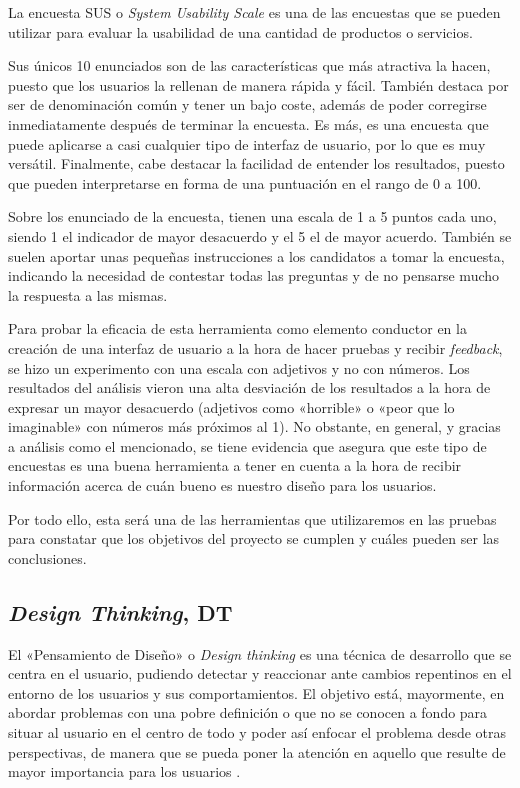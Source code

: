 La encuesta SUS o \textit{System Usability Scale} \cite{sus} es una de las encuestas que se pueden utilizar para evaluar la usabilidad de una cantidad de productos o servicios.

Sus únicos 10 enunciados son de las características que más atractiva la hacen, puesto que los usuarios la rellenan de manera rápida y fácil. También destaca por ser de denominación común y tener un bajo coste, además de poder corregirse inmediatamente después de terminar la encuesta. Es más, es una encuesta que puede aplicarse a casi cualquier tipo de interfaz de usuario, por lo que es muy versátil. Finalmente, cabe destacar la facilidad de entender los resultados, puesto que pueden interpretarse en forma de una puntuación en el rango de 0 a 100.

Sobre los enunciado de la encuesta, tienen una escala de 1 a 5 puntos cada uno, siendo 1 el indicador de mayor desacuerdo y el 5 el de mayor acuerdo. También se suelen aportar unas pequeñas instrucciones a los candidatos a tomar la encuesta, indicando la necesidad de contestar todas las preguntas y de no pensarse mucho la respuesta a las mismas.

Para probar la eficacia de esta herramienta como elemento conductor en la creación de una interfaz de usuario a la hora de hacer pruebas y recibir \textit{feedback}, se hizo un experimento con una escala con adjetivos y no con números. Los resultados del análisis \cite{sus} vieron una alta desviación de los resultados a la hora de expresar un mayor desacuerdo (adjetivos como «horrible» o «peor que lo imaginable» con números más próximos al 1). No obstante, en general, y gracias a análisis como el mencionado, se tiene evidencia que asegura que este tipo de encuestas es una buena herramienta a tener en cuenta a la hora de recibir información acerca de cuán bueno es nuestro diseño para los usuarios.

Por todo ello, esta será una de las herramientas que utilizaremos en las pruebas para constatar que los objetivos del proyecto se cumplen y cuáles pueden ser las conclusiones.

\subsection{\textit{Design Thinking}, DT}

El «Pensamiento de Diseño» o \textit{Design thinking} es una técnica de desarrollo que se centra en el usuario, pudiendo detectar y reaccionar ante cambios repentinos en el entorno de los usuarios y sus comportamientos. El objetivo está, mayormente, en abordar problemas con una pobre definición o que no se conocen a fondo para situar al usuario en el centro de todo y poder así enfocar el problema desde otras perspectivas, de manera que se pueda poner la atención en aquello que resulte de mayor importancia para los usuarios \cite{dt}.

